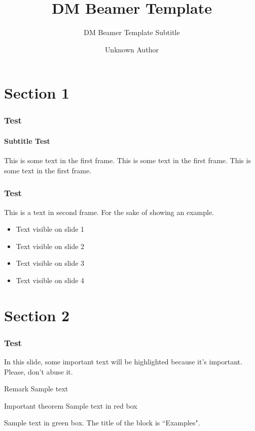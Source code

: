 \documentclass{beamer}
\title{DM Beamer Template}
\subtitle{DM Beamer Template Subtitle}
\author{Unknown Author}
\institute{Data Mining Lab, UESTC}
\begin{document}
\begin{frame}[plain]
    \titlepage
\end{frame}

\begin{frame}
    \tableofcontents[sectionstyle=show,subsectionstyle=show/shaded/hide,subsubsectionstyle=show/shaded/hide]
\end{frame}

\section{Section 1}


\begin{frame}
    \frametitle{Test}
    \framesubtitle{Subtitle Test}
    This is some text in the first frame. This is some text in the first frame. This is some text in the first frame.
\end{frame}

\begin{frame}
    \frametitle{Test}
    This is a text in second frame.
    For the sake of showing an example.

    \begin{itemize}
        \item<1-> Text visible on slide 1
        \item<2-> Text visible on slide 2
        \item<3> Text visible on slide 3
        \item<4-> Text visible on slide 4
    \end{itemize}
\end{frame}

\section{Section 2}

\begin{frame}
    \frametitle{Test}
    In this slide, some important text will be
    \alert{highlighted} because it's important.
    Please, don't abuse it.

    \begin{block}{Remark}
        Sample text
    \end{block}

    \begin{alertblock}{Important theorem}
        Sample text in red box
    \end{alertblock}

    \begin{examples}
        Sample text in green box. The title of the block is ``Examples".
    \end{examples}
\end{frame}
\end{document}
